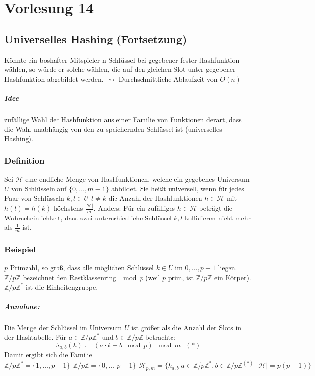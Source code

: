 \chapter{Vorlesung 14}
\section*{Universelles Hashing (Fortsetzung)}
Könnte ein boshafter Mitspieler n Schlüssel bei gegebener fester Hashfunktion wählen, so würde er solche wählen, die auf den gleichen Slot unter gegebener Hashfunktion abgebildet werden. $\rightsquigarrow$ Durchschnittliche Ablaufzeit von $O(n)$
\paragraph{Idee} zufällige Wahl der Hashfunktion aus einer Familie von Funktionen derart, dass die Wahl unabhängig von den zu speichernden Schlüssel ist (universelles Hashing).
\subsection{Definition}
Sei $\mathcal{H}$ eine endliche Menge von Hashfunktionen, welche ein gegebenes Universum $U$ von Schlüsseln auf $\{ 0,\ldots,m-1 \}$ abbildet. Sie heißt universell, wenn für jedes Paar von Schlüsseln $k,l\in U~~l\neq k$ die Anzahl der Hashfunktionen $h\in \mathcal{H}$ mit $h(l)=h(k)$ höchstens $\frac{|\mathcal{H}|}{m}$. Anders: Für ein zufälliges $h\in\mathcal{H}$ beträgt die Wahrscheinlichkeit, dass zwei unterschiedliche Schlüssel $k,l$ kollidieren nicht mehr als $\frac{1}{m}$ ist.
\subsection{Beispiel}
$p$ Primzahl, so groß, dass alle möglichen Schlüssel $k\in U$ im $0,\ldots,p-1$ liegen. $\mathbb{Z}/p\mathbb{Z}$ bezeichnet den Restklassenring $\mod{p}$ (weil $p$ prim, ist $\mathbb{Z}/p\mathbb{Z}$ ein Körper).
$\mathbb{Z}/p\mathbb{Z}^*$ ist die Einheitengruppe.
\paragraph{Annahme:} Die Menge der Schlüssel im Universum $U$ ist größer als die Anzahl der Slots in der Hashtabelle. Für $a\in \mathbb{Z}/p\mathbb{Z}^*$ und $b\in \mathbb{Z}/p\mathbb{Z}$ betrachte:
\[ h_{a,b}(k) := (a\cdot k + b \mod{p})\mod{m} ~~~(*)\]
Damit ergibt sich die Familie
\[ \mathbb{Z}/p\mathbb{Z}^*=\{ 1,\ldots,p-1 \}~~\mathbb{Z}/p\mathbb{Z}=\{ 0,\ldots,p-1 \}~~ \mathcal{H}_{p,m}=\{h_{a,b}|a\in \mathbb{Z}/p\mathbb{Z}^*, b \in\mathbb{Z}/p\mathbb{Z}^{(*)}~~|\mathcal{H}|=p(p-1)  \} \]
